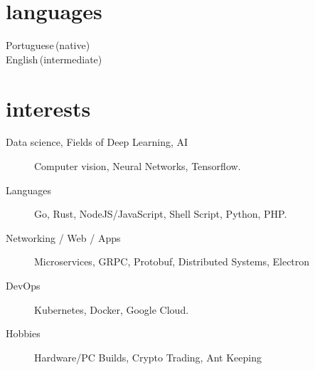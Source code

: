 \documentclass[]{cv-mauri}
\begin{document}
\section*{languages}
\begin{tabularcv}
    Portuguese\,(native) \\
    English\,(intermediate)
\end{tabularcv}

\section*{interests}
\begin{description}
	\item [Data science, Fields of Deep Learning, AI] Computer vision, Neural Networks, Tensorflow.
	\item [Languages] Go, Rust, NodeJS/JavaScript, Shell Script, Python, PHP.
	\item [Networking / Web / Apps] Microservices, GRPC, Protobuf, Distributed Systems, Electron
	\item [DevOps] Kubernetes, Docker, Google Cloud.
	\item [Hobbies] Hardware/PC Builds, Crypto Trading, Ant Keeping
\end{description}
\end{document}
